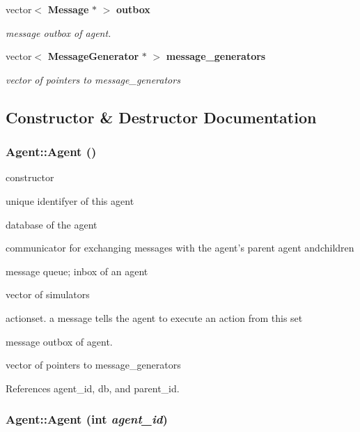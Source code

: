 \begin{CompactItemize}
vector$<$ {\bf Message} $\ast$ $>$ {\bf outbox}
\begin{CompactList}\small\item\em message outbox of agent. \item\end{CompactList}\item 
vector$<$ {\bf MessageGenerator} $\ast$ $>$ {\bf message\_\-generators}
\begin{CompactList}\small\item\em vector of pointers to message\_\-generators \item\end{CompactList}\end{CompactItemize}


\subsection{Constructor \& Destructor Documentation}
\subsubsection[Agent]{\setlength{\rightskip}{0pt plus 5cm}Agent::Agent ()}\label{classHive_1_1Agent_24a60f1d260bf19a4f7f8a5f36881d3f}


constructor 



unique identifyer of this agent

database of the agent

communicator for exchanging messages with the agent's parent agent andchildren

message queue; inbox of an agent

vector of simulators

actionset. a message tells the agent to execute an action from this set

message outbox of agent.

vector of pointers to message\_\-generators 

References agent\_\-id, db, and parent\_\-id.
\subsubsection[Agent]{\setlength{\rightskip}{0pt plus 5cm}Agent::Agent (int {\em agent\_\-id})}\label{classHive_1_1Agent_9bdb60eaf7b1967cb0e77665af1d0d4e}




